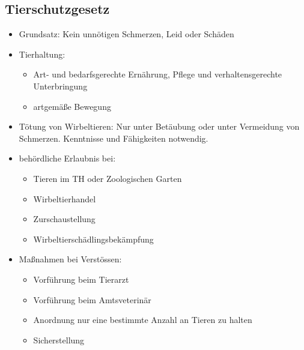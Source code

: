     \subsection{Tierschutzgesetz}
        \begin{itemize}
            \item Grundsatz: Kein unnötigen Schmerzen, Leid oder Schäden
            \item Tierhaltung:
            \begin{itemize}
                \item Art- und bedarfsgerechte Ernährung, Pflege und verhaltensgerechte Unterbringung
                \item artgemäße Bewegung
            \end{itemize}
            \item Tötung von Wirbeltieren: Nur unter Betäubung oder unter Vermeidung von Schmerzen. Kenntnisse und Fähigkeiten notwendig.
            \item behördliche Erlaubnis bei:
            \begin{itemize}
                \item Tieren im TH oder Zoologischen Garten
                \item Wirbeltierhandel
                \item Zurschaustellung
                \item Wirbeltierschädlingsbekämpfung
            \end{itemize}

            \item Maßnahmen bei Verstössen:
            \begin{itemize}
                \item Vorführung beim Tierarzt
                \item Vorführung beim Amtsveterinär
                \item Anordnung nur eine bestimmte Anzahl an Tieren zu halten
                \item Sicherstellung
            \end{itemize}
        \end{itemize}

